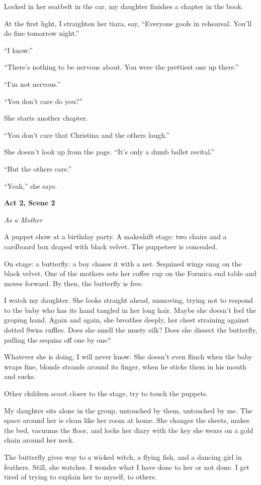 \documentclass[twoside,10pt]{book}
\begin{document}
Locked in her seatbelt in the car, my daughter finishes a chapter in the
book.

At the first light, I straighten her tiara, say, ``Everyone goofs in
rehearsal. You'll do fine tomorrow night.''

``I know.''

``There's nothing to be nervous about. You were the prettiest one up
there.''

``I'm not nervous.''

``You don't care do you?''

She starts another chapter.

``You don't care that Christina and the others laugh.''

She doesn't look up from the page. ``It's only a dumb ballet recital.''

``But the others care.''

``Yeah,'' she says.

\textbf{Act 2, Scene 2}

\emph{As a Mother}

A puppet show at a birthday party. A makeshift stage: two chairs and a
cardboard box draped with black velvet. The puppeteer is concealed.

On stage: a butterfly: a boy chases it with a net. Sequined wings snag
on the black velvet. One of the mothers sets her coffee cup on the
Formica end table and moves forward. By then, the butterfly is free.

I watch my daughter. She looks straight ahead, unmoving, trying not to
respond to the baby who has its hand tangled in her long hair. Maybe she
doesn't feel the groping hand. Again and again, she breathes deeply, her
chest straining against dotted Swiss ruffles. Does she smell the musty
silk? Does she dissect the butterfly, pulling the sequins off one by
one?

Whatever she is doing, I will never know. She doesn't even flinch when
the baby wraps fine, blonde strands around its finger, when he sticks
them in his mouth and sucks.

Other children scoot closer to the stage, try to touch the puppets.

My daughter sits alone in the group, untouched by them, untouched by me.
The space around her is clean like her room at home. She changes the
sheets, makes the bed, vacuums the floor, and locks her diary with the
key she wears on a gold chain around her neck.

The butterfly gives way to a wicked witch, a flying fish, and a dancing
girl in feathers. Still, she watches. I wonder what I have done to her
or not done. I get tired of trying to explain her to myself, to others.
\end{document}
